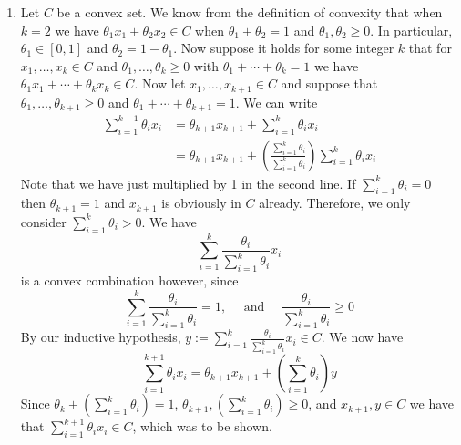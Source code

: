 \documentclass[11pt]{amsart}
\begin{document}
\begin{enumerate}
\item Let $C$ be a convex set.  We know from the definition of convexity that when $k = 2$ we have $\theta_1 x_1 + \theta_2 x_2 \in C$ when $\theta_1+\theta_2 = 1$ and $\theta_1,\theta_2\ge 0$.  In particular, $\theta_1 \in [0,1]$ and $\theta_2 = 1 - \theta_1$.  Now suppose it holds for some integer $k$ that for $x_1,\ldots,x_k \in C$ and $\theta_1,\ldots,\theta_k \ge 0$ with $\theta_1+\cdots+\theta_k = 1$ we have $\theta_1 x_1 + \cdots + \theta_kx_k \in C$.  Now let $x_1,\ldots,x_{k+1} \in C$ and suppose that $\theta_1,\ldots,\theta_{k+1} \ge 0$ and $\theta_1 + \cdots + \theta_{k+1} = 1$.  We can write
\begin{align*}
\sum_{i=1}^{k+1}\theta_ix_i &= \theta_{k+1}x_{k+1} +  \sum_{i=1}^k \theta_ix_i\\
&= \theta_{k+1}x_{k+1} + \left( \frac{\sum_{i=1}^k \theta_i}{\sum_{i=1}^k \theta_i } \right) \sum_{i=1}^k \theta_ix_i
\end{align*}
Note that we have just multiplied by 1 in the second line.  If $\sum_{i=1}^k \theta_i = 0$ then $\theta_{k+1} = 1$ and $x_{k+1}$ is obviously in $C$ already.  Therefore, we only consider $\sum_{i=1}^k \theta_i > 0$.  We have
\[
\sum_{i=1}^k \frac{\theta_i}{\sum_{i=1}^k \theta_i}x_i
\]
is a convex combination however, since 
\[
\sum_{i=1}^k \frac{\theta_i}{\sum_{i=1}^k \theta_i}= 1,\quad \text{ and } \quad  \frac{\theta_i}{\sum_{i=1}^k \theta_i} \ge 0
\]
By our inductive hypothesis, $y := \sum_{i=1}^k \frac{\theta_i}{\sum_{i=1}^k \theta_i}x_i \in C$.  We now have
\[
\sum_{i=1}^{k+1}\theta_ix_i = \theta_{k+1}x_{k+1} + \left(\sum_{i=1}^k \theta_i\right)y
\]
Since $\theta_k +  \left(\sum_{i=1}^k \theta_i\right) = 1$, $\theta_{k+1},  \left(\sum_{i=1}^k \theta_i\right) \ge 0$, and $x_{k+1},y\in C$ we have that $\sum_{i=1}^{k+1}\theta_ix_i \in C$, which was to be shown.


\vspace{0.5in}


\end{enumerate}
\end{document}
